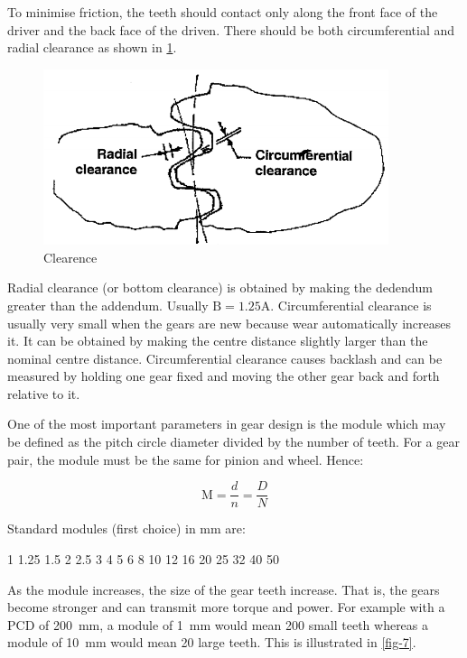 To minimise friction, the teeth should contact only along the front face of the driver and the back face of the driven. There should be both circumferential and radial clearance as shown in \cref{fig-6}.

\begin{figure}[h!]
  \center
  \includegraphics[width=0.9\textwidth]{figs/fig6.png}
  \caption{Clearence}
  \label{fig-6}
\end{figure}

Radial clearance (or bottom clearance) is obtained by making the dedendum greater than the addendum. Usually $\text{B}=1.25\text{A}$. Circumferential clearance is usually very small when the gears are new because wear automatically increases it. It can be obtained by making the centre distance slightly larger than the nominal centre distance. Circumferential clearance causes backlash and can be measured by holding one gear fixed and moving the other gear back and forth relative to it.

One of the most important parameters in gear design is the module which may be defined as the pitch circle diameter divided by the number of teeth. For a gear pair, the module must be the same for pinion and wheel. Hence:

\begin{equation}
  \text{M} = \frac{d}{n} = \frac{D}{N}
\end{equation}

Standard modules (first choice) in \si{\milli\metre} are:

1 1.25 1.5 2 2.5 3 4 5 6 8 10 12 16 20 25 32 40 50

As the module increases, the size of the gear teeth increase. That is, the gears become stronger and can transmit more torque and power. For example with a PCD of \SI{200}{\milli\metre}, a module of \SI{1}{\milli\metre} would mean 200 small teeth whereas a module of \SI{10}{\milli\metre} would mean 20 large teeth. This is illustrated in \cref{fig-7}.

